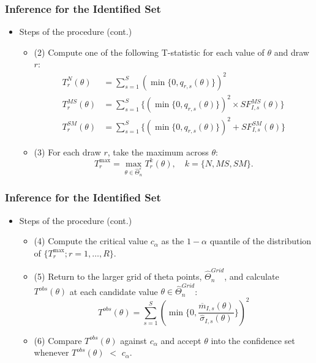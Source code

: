 \documentclass[10pt,letterpaper]{beamer}
\begin{document}
\begin{frame}
\frametitle{Inference for the Identified Set}

\begin{itemize}
	\item Steps of the procedure (cont.)
	\begin{itemize}
		\item (2) Compute one of the following T-statistic for each value of $\theta$ and draw $r$:
		\begin{equation*}
		\begin{split}
		T^{N}_{r}(\theta)&=\sum_{s=1}^{S}(\min\{0,q_{r,s}(\theta)\})^{2}\\
		T^{MS}_{r}(\theta)&=\sum_{s=1}^{S}\{(\min\{0,q_{r,s}(\theta)\})^{2}\times SF^{MS}_{I,s}(\theta)\}\\
		T^{SM}_{r}(\theta)&=\sum_{s=1}^{S}\{(\min\{0,q_{r,s}(\theta)\})^{2} + SF^{SM}_{I,s}(\theta)\}
		\end{split}
		\end{equation*}
		\item (3) For each draw $r$, take the maximum across $\theta$:
		\begin{equation*}
		T^{\max}_{r}=\max_{\theta\in\widehat{\Theta}_{n}^{\varepsilon}}T^{k}_{r}(\theta),\quad k=\{N, MS, SM\}.
		\end{equation*}
	\end{itemize}
\end{itemize}
\end{frame}
\begin{frame}
\frametitle{Inference for the Identified Set}

\begin{itemize}
	\item Steps of the procedure (cont.)
	\begin{itemize}
		\item (4) Compute the critical value $c_{\alpha}$ as the $1-\alpha$ quantile of the distribution of $\{T^{\max}_{r}; r=1,\dots,R\}$.
		\item (5) Return to the larger grid of theta points, $\widehat{\Theta }_{n}^{Grid}$, and calculate $T^{obs}(\theta)$ at each candidate value $\theta\in\widehat{\Theta}_{n}^{Grid}$:
		\begin{equation*}
		T^{obs}(\theta)=\sum_{s=1}^{S}(\min\{0,\frac{\overline{m}_{I,s}(\theta)}{\hat{\sigma} _{I,s}(\theta)}\})^{2}
		\end{equation*}
		\item (6) Compare $T^{obs}(\theta)$ against $c_{\alpha}$ and accept $\theta$ into the confidence set whenever $T^{obs}(\theta)$ $<$ $c_{\alpha}$.
	\end{itemize}
\end{itemize}
\end{frame}
\end{document}
